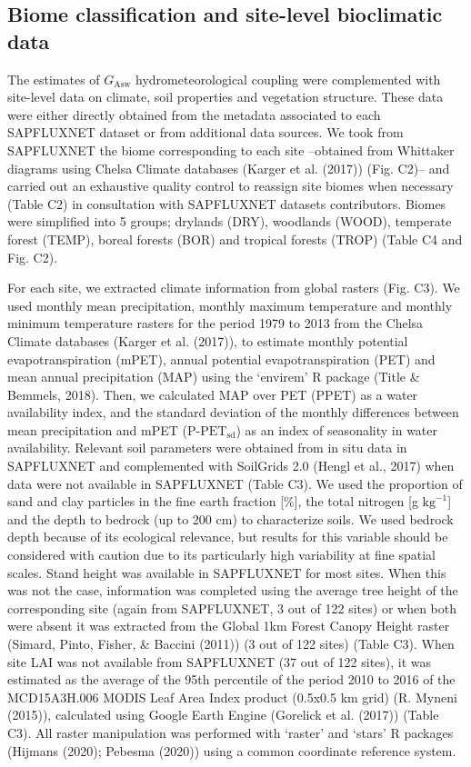 \documentclass[11pt,twoside]{reedthesis}
\begin{document}
\subsection{Biome classification and site-level bioclimatic
data}\label{biome-classification-and-site-level-bioclimatic-data}

The estimates of \(G_{\text{Asw}}\) hydrometeorological coupling were
complemented with site-level data on climate, soil properties and
vegetation structure. These data were either directly obtained from the
metadata associated to each SAPFLUXNET dataset or from additional data
sources. We took from SAPFLUXNET the biome corresponding to each site
--obtained from Whittaker diagrams using Chelsa Climate databases
(Karger et al. (2017)) (Fig. C2)-- and carried out an exhaustive quality
control to reassign site biomes when necessary (Table C2) in
consultation with SAPFLUXNET datasets contributors. Biomes were
simplified into 5 groups; drylands (DRY), woodlands (WOOD), temperate
forest (TEMP), boreal forests (BOR) and tropical forests (TROP) (Table
C4 and Fig. C2).\par

For each site, we extracted climate information from global rasters
(Fig. C3). We used monthly mean precipitation, monthly maximum
temperature and monthly minimum temperature rasters for the period 1979
to 2013 from the Chelsa Climate databases (Karger et al. (2017)), to
estimate monthly potential evapotranspiration (mPET), annual potential
evapotranspiration (PET) and mean annual precipitation (MAP) using the
`envirem' R package (Title \& Bemmels, 2018). Then, we calculated MAP
over PET (PPET) as a water availability index, and the standard
deviation of the monthly differences between mean precipitation and mPET
(\(\text{P-PET}_{\text{sd}}\)) as an index of seasonality in water
availability. Relevant soil parameters were obtained from in situ data
in SAPFLUXNET and complemented with SoilGrids 2.0 (Hengl et al., 2017)
when data were not available in SAPFLUXNET (Table C3). We used the
proportion of sand and clay particles in the fine earth fraction
{[}\%{]}, the total nitrogen {[}g \(\text{kg}^{-1}\){]} and the depth to
bedrock (up to 200 cm) to characterize soils. We used bedrock depth
because of its ecological relevance, but results for this variable
should be considered with caution due to its particularly high
variability at fine spatial scales. Stand height was available in
SAPFLUXNET for most sites. When this was not the case, information was
completed using the average tree height of the corresponding site (again
from SAPFLUXNET, 3 out of 122 sites) or when both were absent it was
extracted from the Global 1km Forest Canopy Height raster (Simard,
Pinto, Fisher, \& Baccini (2011)) (3 out of 122 sites) (Table C3). When
site LAI was not available from SAPFLUXNET (37 out of 122 sites), it was
estimated as the average of the 95th percentile of the period 2010 to
2016 of the MCD15A3H.006 MODIS Leaf Area Index product (0.5x0.5 km grid)
(R. Myneni (2015)), calculated using Google Earth Engine (Gorelick et
al. (2017)) (Table C3). All raster manipulation was performed with
`raster' and `stars' R packages (Hijmans (2020); Pebesma (2020)) using a
common coordinate reference system.\par
\end{document}
